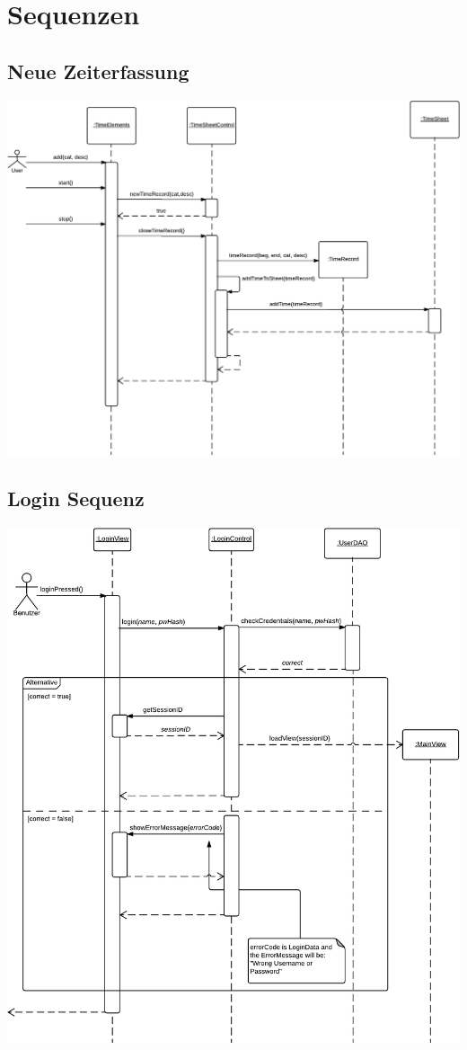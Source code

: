 \section{Sequenzen}
    \subsection{Neue Zeiterfassung}
        \includegraphics[width=\linewidth]{Diagramms/sequenzes/new_Time_record.pdf}\\
    \subsection{Login Sequenz}
        \includegraphics[width=\linewidth]{Diagramms/sequenzes/login.pdf}\\
